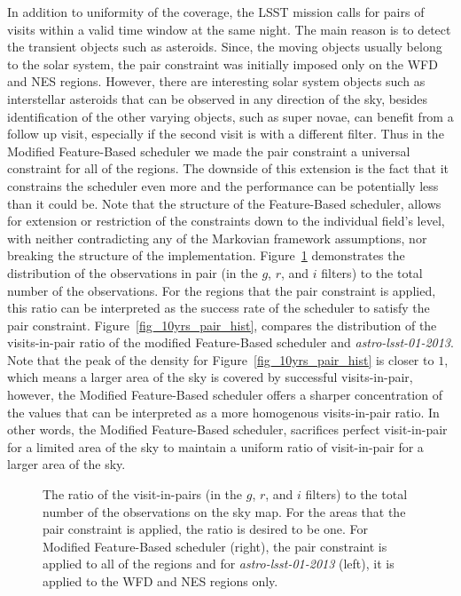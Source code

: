\documentclass[12pt]{aastex62}
\theoremstyle{definition}
\begin{document}
In addition to uniformity of the coverage, the LSST mission calls for pairs of visits within a valid time window at the same night. The main reason is to detect the transient objects such as asteroids. Since, the moving objects usually belong to the solar system, the pair constraint was initially imposed only on the WFD and NES regions. However, there are interesting solar system objects such as interstellar asteroids that can be observed in any direction of the sky, besides identification of the other varying objects, such as super novae, can benefit from a follow up visit, especially if the second visit is with a different filter. Thus in the Modified Feature-Based scheduler we made the pair constraint a universal constraint for all of the regions. The downside of this extension is the fact that it constrains the scheduler even more and the performance can be potentially less than it could be. Note that the structure of the Feature-Based scheduler, allows for extension or restriction of the constraints down to the individual field's level, with neither contradicting any of the Markovian framework assumptions, nor breaking the structure of the implementation. Figure~\ref{fig_10yrs_pair} demonstrates the distribution of the observations in pair (in the $g$, $r$, and $i$ filters) to the total number of the observations. For the regions that the pair constraint is applied, this ratio can be interpreted as the success rate of the scheduler to satisfy the pair constraint. Figure~\ref{fig_10yrs_pair_hist}, compares the distribution of the visits-in-pair ratio of the modified Feature-Based scheduler and \textit{astro-lsst-01-2013}. Note that the peak of the density for Figure~\ref{fig_10yrs_pair_hist} is closer to $1$, which means a larger area of the sky is covered by successful visits-in-pair, however, the Modified Feature-Based scheduler offers a sharper concentration of the values that can be interpreted as a more homogenous visits-in-pair ratio. In other words, the Modified Feature-Based scheduler, sacrifices perfect visit-in-pair for a limited area of the sky to maintain a uniform ratio of visit-in-pair for a larger area of the sky.

\begin{figure}[h!]
\caption{The ratio of the visit-in-pairs (in the $g$, $r$, and $i$ filters) to the total number of the observations on the sky map. For the areas that the pair constraint is applied, the ratio is desired to be one. For Modified Feature-Based scheduler (right), the pair constraint is applied to all of the regions and for \textit{astro-lsst-01-2013} (left), it is applied to the WFD and NES regions only.}
\label{fig_10yrs_pair}
\end{figure}
\end{document}

